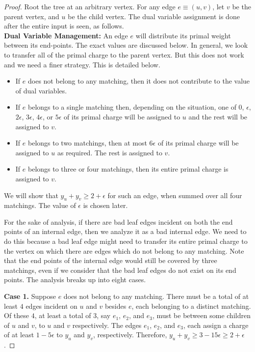 \documentclass[11pt]{article}
\begin{document}
\begin{proof}
  Root the tree at an arbitrary vertex. For any edge $e\equiv (u,v)$, let $v$ be the parent vertex, and $u$ be the child vertex. The dual variable assignment is done after the entire input is seen, as follows.\\ 
\textbf{Dual Variable Management:} An edge $e$ will distribute its primal weight between its end-points. The exact values are discussed below. In general, we look to transfer all of the primal charge to the parent vertex. But this does not work and we need a finer strategy. This is detailed below.
\begin{itemize}
 \item If $e$ does not belong to any matching, then it does not contribute to the value of dual variables.
 \item If $e$ belongs to a single matching then, depending on the situation, one of $0$, $\epsilon$, $2\epsilon$, $3\epsilon$, $4\epsilon$, or $5\epsilon$ of its primal charge will be assigned to $u$ and the rest will be assigned to $v$.
 \item If $e$ belongs to two matchings, then at most $6\epsilon$ of its primal charge will be assigned to $u$ as required. The
	 rest is assigned to $v$.
 \item If $e$ belongs to three or four matchings, then its entire primal charge is assigned to $v$.
 \end{itemize}

We will show that $y_u+y_v\geq 2+\epsilon$ for such an edge, when summed over all four matchings. The value of $\epsilon$ is chosen later.  
 
  For the sake of analysis, if there are bad leaf edges incident on both the end points of an internal edge, then we analyze it as a bad internal edge. We need to do this because a bad leaf edge might need to transfer its entire primal charge to the vertex on which there are edges which do not belong to any matching. Note that the end points of the internal edge would still be covered by three matchings, even if we consider that the bad leaf edges do not exist on its end points. The analysis breaks up into eight cases.
  
   \textbf{Case 1.} Suppose $e$ does not belong to any matching. There must be a total of at least $4$ edges incident on $u$ and $v$ besides $e$, each belonging to a distinct matching. Of these $4$, at least a total of $3$, say $e_1$, $e_2$, and $e_3$, must be between some children of $u$ and $v$, to $u$ and $v$ respectively. The edges $e_1$, $e_2$, and $e_3$, each assign a charge of  at least $1-5\epsilon$ to $y_u$ and $y_v$, respectively. Therefore, $y_u+y_v\geq 3-15\epsilon \geq 2+\epsilon$.
  

\end{proof}
\end{document}
